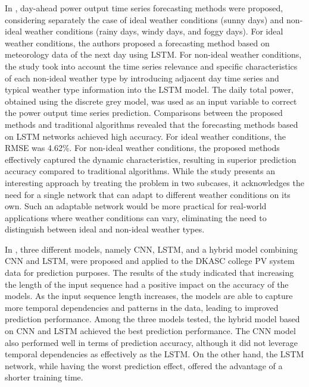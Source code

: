 In \cite{GAO2019115838}, day-ahead power output time series forecasting methods were proposed, considering separately the case of ideal weather conditions (sunny days) and non-ideal weather conditions (rainy days, windy days, and foggy days).
For ideal weather conditions, the authors proposed a forecasting method based on meteorology data of the next day using LSTM.
For non-ideal weather conditions, the study took into account the time series relevance and specific characteristics of each non-ideal weather type by introducing adjacent day time series and typical weather type information into the LSTM model.
The daily total power, obtained using the discrete grey model, was used as an input variable to correct the power output time series prediction.
Comparisons between the proposed methods and traditional algorithms revealed that the forecasting methods based on LSTM networks achieved high accuracy.
For ideal weather conditions, the RMSE was 4.62\%.
For non-ideal weather conditions, the proposed methods effectively captured the dynamic characteristics, resulting in superior prediction accuracy compared to traditional algorithms.
While the study presents an interesting approach by treating the problem in two subcases, it acknowledges the need for a single network that can adapt to different weather conditions on its own.
Such an adaptable network would be more practical for real-world applications where weather conditions can vary, eliminating the need to distinguish between ideal and non-ideal weather types.

In \cite{WANG2019113315}, three different models, namely CNN, LSTM, and a hybrid model combining CNN and LSTM, were proposed and applied to the DKASC college PV system data for prediction purposes.
The results of the study indicated that increasing the length of the input sequence had a positive impact on the accuracy of the models.
As the input sequence length increases, the models are able to capture more temporal dependencies and patterns in the data, leading to improved prediction performance.
Among the three models tested, the hybrid model based on CNN and LSTM achieved the best prediction performance.
The CNN model also performed well in terms of prediction accuracy, although it did not leverage temporal dependencies as effectively as the LSTM.
On the other hand, the LSTM network, while having the worst prediction effect, offered the advantage of a shorter training time.

